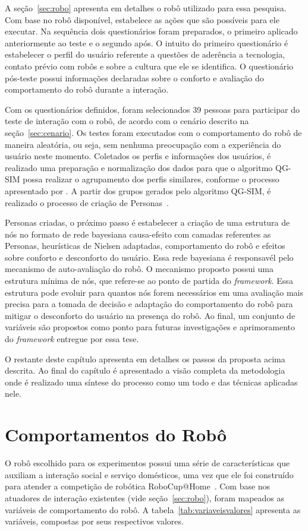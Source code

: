 A seção~\ref{sec:robo} apresenta em detalhes o robô utilizado para essa pesquisa. Com base no robô disponível, estabelece as ações que são possíveis para ele executar. Na sequência dois questionários foram preparados, o primeiro aplicado anteriormente ao teste e o segundo após. O intuito do primeiro questionário é estabelecer o perfil do usuário referente a questões de aderência a tecnologia, contato prévio com robôs e sobre a cultura que ele se identifica. O questionário pós-teste possui informações declaradas sobre o conforto e avaliação do comportamento do robô durante a interação.

Com os questionários definidos, foram selecionados 39 pessoas para participar do teste de interação com o robô, de acordo com o cenário descrito na seção~\ref{sec:cenario}. Os testes foram executados com o comportamento do robô de maneira aleatória, ou seja, sem nenhuma preocupação com a experiência do usuário neste momento. Coletados os perfis e informações dos usuários, é realizado uma preparação e normalização dos dados para que o algoritmo QG-SIM possa realizar o agrupamento dos perfis similares, conforme o processo apresentado por . A partir dos grupos gerados pelo algoritmo QG-SIM, é realizado o processo de criação de Personas~\cite{masiero:2013, masiero:2013b}.

Personas criadas, o próximo passo é estabelecer a criação de uma estrutura de nós no formato de rede bayesiana causa-efeito com camadas referentes as Personas, heurísticas de Nielsen adaptadas, comportamento do robô e efeitos sobre conforto e desconforto do usuário. Essa rede bayesiana é responsavél pelo mecanismo de auto-avaliação do robô. O mecanismo proposto possui uma estrutura mínima de nós, que refere-se ao ponto de partida do \emph{framework}. Essa estrutura pode evoluir para quantos nós forem necessários em uma avaliação mais precisa para a tomada de decisão e adaptação do comportamento do robô para mitigar o desconforto do usuário na presença do robô. Ao final, um conjunto de variáveis são propostos como ponto para futuras investigações e aprimoramento do \emph{framework} entregue por essa tese.

O restante deste capítulo apresenta em detalhes os passos da proposta acima descrita. Ao final do capítulo é apresentado a visão completa da metodologia onde é realizado uma síntese do processo como um todo e das técnicas aplicadas nele.

\section{Comportamentos do Robô}
\label{sec:comportamento-robo}
O robô escolhido para os experimentos possui uma série de características que auxiliam a interação social e serviço domésticos, uma vez que ele foi construído para atender a competição de robótica RoboCup@Home~\cite{robocup:2015}. Com base nos atuadores de interação existentes (vide seção~\ref{sec:robo}), foram mapeados as variáveis de comportamento do robô. A tabela~\ref{tab:variaveisvalores} apresenta as variáveis, compostas por seus respectivos valores.


